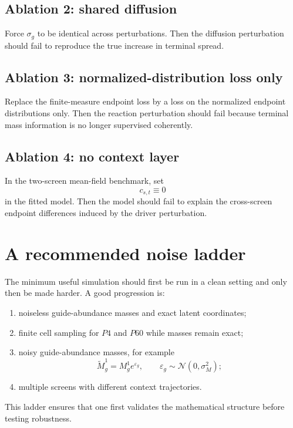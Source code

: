 \documentclass[11pt]{article}
\begin{document}
\subsection{Ablation 2: shared diffusion}

Force \(\sigma_g\) to be identical across perturbations. Then the diffusion perturbation should fail to reproduce the true increase in terminal spread.

\subsection{Ablation 3: normalized-distribution loss only}

Replace the finite-measure endpoint loss by a loss on the normalized endpoint distributions only. Then the reaction perturbation should fail because terminal mass information is no longer supervised coherently.

\subsection{Ablation 4: no context layer}

In the two-screen mean-field benchmark, set
\[
c_{s,t}\equiv 0
\]
in the fitted model. Then the model should fail to explain the cross-screen endpoint differences induced by the driver perturbation.

\section{A recommended noise ladder}

The minimum useful simulation should first be run in a clean setting and only then be made harder. A good progression is:
\begin{enumerate}[label=(N\arabic*),leftmargin=2.6em]
    \item noiseless guide-abundance masses and exact latent coordinates;
    \item finite cell sampling for \(P4\) and \(P60\) while masses remain exact;
    \item noisy guide-abundance masses, for example
    \[
    \tilde M_g^1 = M_g^1 e^{\varepsilon_g},
    \qquad
    \varepsilon_g\sim\mathcal{N}(0,\sigma_M^2);
    \]
    \item multiple screens with different context trajectories.
\end{enumerate}

This ladder ensures that one first validates the mathematical structure before testing robustness.
\end{document}
